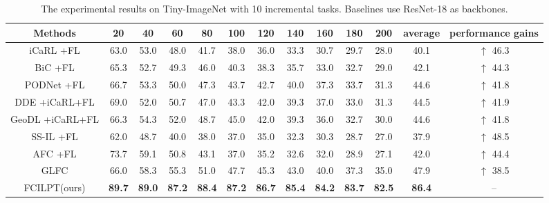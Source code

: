 \documentclass[sigconf,anonymous,review,screen]{acmart}
\begin{document}
\begin{table*}[t] \footnotesize
	\centering
	\caption{The experimental results on Tiny-ImageNet with 10 incremental tasks. Baselines use ResNet-18 as backbones.}
	\label{tab:3}{
		\begin{tabular}{ccccccccccccc}
			\toprule
			Methods & 20 & 40 & 60 & 80 & 100 & 120 & 140 & 160 & 180 & 200 & average &performance gains\\
			\midrule
			iCaRL \cite{rebuffi2017icarl}+FL & 63.0 & 53.0 & 48.0 & 41.7 & 38.0 & 36.0 & 33.3 & 30.7 & 29.7 & 28.0 & 40.1 & $\uparrow$ 46.3  \\
			BiC \cite{wu2019large}+FL & 65.3 & 52.7 & 49.3 & 46.0 & 40.3 & 38.3 & 35.7 & 33.0 & 32.7 & 29.0 & 42.1 & $\uparrow$ 44.3 \\
			PODNet \cite{douillard2020podnet}+FL & 66.7 & 53.3 & 50.0 & 47.3 & 43.7 & 42.7 & 40.0 & 37.3 & 33.7 & 31.3 & 44.6 & $\uparrow$ 41.8 \\
			DDE \cite{hu2021distilling}+iCaRL+FL & 69.0 & 52.0 & 50.7 & 47.0 & 43.3 & 42.0 & 39.3 & 37.0 & 33.0 & 31.3 & 44.5 & $\uparrow$ 41.9 \\
			GeoDL \cite{simon2021learning}+iCaRL+FL & 66.3 & 54.3 & 52.0 & 48.7 & 45.0 & 42.0 & 39.3 & 36.0 & 32.7 & 30.0 & 44.6 & $\uparrow$ 41.8 \\
			SS-IL \cite{ahn2021ss}+FL & 62.0 & 48.7 & 40.0 & 38.0 & 37.0 & 35.0 & 32.3 & 30.3 & 28.7 & 27.0 & 37.9 & $\uparrow$ 48.5 \\
			AFC \cite{kang2022class}+FL & 73.7 & 59.1 & 50.8 & 43.1 & 37.0 & 35.2 & 32.6 & 32.0 & 28.9 & 27.1 & 42.0 & $\uparrow$ 44.4 \\
			GLFC \cite{dong2022federated}& 66.0 & 58.3 & 55.3 & 51.0 & 47.7 & 45.3 & 43.0 & 40.0 & 37.3 & 35.0 & 47.9 & $\uparrow$ 38.5 \\
			FCILPT(ours) & \textbf{89.7} & \textbf{89.0} & \textbf{87.2} & \textbf{88.4} & \textbf{87.2} & \textbf{86.7} & \textbf{85.4} & \textbf{84.2} & \textbf{83.7} & \textbf{82.5} & \textbf{86.4} & -- \\
			\bottomrule
	\end{tabular}	}
\end{table*}









\end{document}
